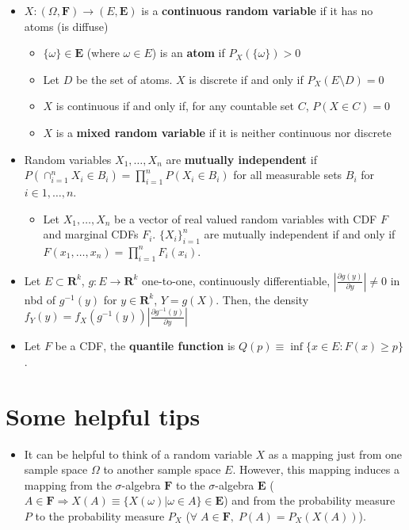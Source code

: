 \documentclass[12pt,english]{article}
\begin{document}
\begin{itemize}
\begin{itemize}
	\end{itemize}
	\item $X : (\Omega, \textbf{F}) \to (E, \mathbf{E})$ is a \textbf{continuous random variable} if it has no atoms (is diffuse)
	\begin{itemize}
		\item $\{ \omega \} \in \mathbf{E}$ (where $\omega \in E$) is an \textbf{atom} if $P_{X}(\{ \omega \}) > 0$
		\item Let $D$ be the set of atoms. $X$ is discrete if and only if $P_{X}(E \setminus D) = 0$
		\item $X$ is continuous if and only if, for any countable set $C$, $P(X \in C) = 0$
		\item $X$ is a \textbf{mixed random variable} if it is neither continuous nor discrete
	\end{itemize}
	\item Random variables $X_{1}, \ldots, X_{n}$ are \textbf{mutually independent} if $P(\cap_{i = 1}^{n} {X_{i} \in B_{i}}) = \prod_{i=1}^{n} P(X_{i} \in B_{i})$ for all measurable sets $B_{i}$ for $i \in 1, \ldots, n$.
	\begin{itemize}
		\item Let $X_{1}, \ldots, X_{n}$ be a vector of real valued random variables with CDF $F$ and marginal CDFs $F_{i}$. $\{ X_{i} \}_{i=1}^{n}$ are mutually independent if and only if $F(x_{1}, \ldots, x_{n}) = \prod_{i=1}^{n} F_{i}(x_{i})$.
	\end{itemize}
	\item Let $E \subset \mathbf{R}^{k}$, $g : E \to \mathbf{R}^{k}$ one-to-one, continuously differentiable, $\left| \frac{\partial g(y)}{\partial y} \right| \neq 0$ in nbd of $g^{-1}(y)$ for $y \in \mathbf{R}^{k}$, $Y = g(X)$. Then, the density $f_{Y}(y) = f_{X}(g^{-1}(y)) \left| \frac{\partial g^{-1}(y)}{\partial y} \right|$
	\item Let $F$ be a CDF, the \textbf{quantile function} is $Q(p) \equiv \inf \{ x \in E : F(x) \geq p \}$.
\end{itemize}

\section{Some helpful tips}

\begin{itemize}
	\item It can be helpful to think of a random variable $X$ as a mapping just from one sample space $\Omega$ to another sample space $E$. However, this mapping induces a mapping from the $\sigma$-algebra $\mathbf{F}$ to the $\sigma$-algebra $\mathbf{E}$ ($A \in \mathbf{F} \Rightarrow X(A) \equiv \{ X(\omega) | \omega \in A \} \in \mathbf{E}$) and from the probability measure $P$ to the probability measure $P_{X}$ ($\forall \; A \in \mathbf{F}, \; P(A) = P_{X}(X(A))$).
\end{itemize}
\end{document}
